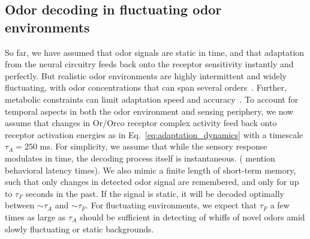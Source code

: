 \subsection{Odor decoding in fluctuating odor environments}
So far, we have assumed that odor signals are static in time, and that adaptation from the neural circuitry feeds back onto the receptor sensitivity instantly and perfectly. But realistic odor environments are highly intermittent and widely fluctuating, with odor concentrations that can span several orders~\cite{celani}. Further, metabolic constraints can limit adaptation speed and accuracy~\cite{ESA}. To account for temporal aspects in both the odor environment and sensing periphery, we now assume that changes in Or/Orco receptor complex activity feed back onto receptor activation energies as in Eq.~\ref{eq:adaptation_dynamics} with a timescale $\tau_A = 250$ ms. For simplicity, we assume that while the sensory response modulates in time, the decoding process itself is instantaneous. ({\color{blue} mention behavioral latency times}). We also mimic a finite length of short-term memory, such that only changes in detected odor signal are remembered, and  only for up to $\tau_{F}$ seconds in the past. If the signal is static, it will be decoded optimally between $\sim\tau_A$ and $\sim\tau_F$. For fluctuating environments, we expect that $\tau_F$ a few times as large as $\tau_A$ should be sufficient in detecting of whiffs of novel odors amid slowly fluctuating or static backgrounds.




